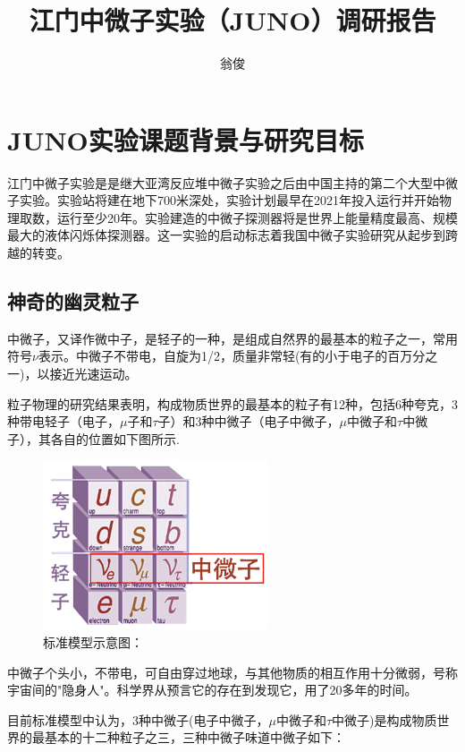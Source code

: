 \documentclass[10pt,a4paper]{article}
\author{翁俊}
\title{江门中微子实验（JUNO）调研报告}
\begin{document}
\maketitle
\newpage
\tableofcontents
\newpage

\section{JUNO实验课题背景与研究目标}

江门中微子实验是是继大亚湾反应堆中微子实验之后由中国主持的第二个大型中微子实验。实验站将建在地下700米深处，实验计划最早在2021年投入运行并开始物理取数，运行至少20年。实验建造的中微子探测器将是世界上能量精度最高、规模最大的液体闪烁体探测器。这一实验的启动标志着我国中微子实验研究从起步到跨越的转变。

	
\subsection{神奇的幽灵粒子}
中微子，又译作微中子，是轻子的一种，是组成自然界的最基本的粒子之一，常用符号$\nu$表示。中微子不带电，自旋为1/2，质量非常轻(有的小于电子的百万分之一)，以接近光速运动。



粒子物理的研究结果表明，构成物质世界的最基本的粒子有12种，包括6种夸克，3种带电轻子（电子，$\mu $子和$\tau$子）和3种中微子（电子中微子，$\mu$中微子和$\tau$中微子），其各自的位置如下图所示.

\begin{figure}[ht]
 \centering
 \includegraphics[height=5cm]{images/standarmodel.jpg}
 \caption{标准模型示意图：}
 \label{fig:singleblock}
\end{figure}

中微子个头小，不带电，可自由穿过地球，与其他物质的相互作用十分微弱，号称宇宙间的"隐身人"。科学界从预言它的存在到发现它，用了20多年的时间。

目前标准模型中认为，3种中微子(电子中微子，$\mu$中微子和$\tau$中微子)是构成物质世界的最基本的十二种粒子之三，三种中微子味道中微子如下：
\end{document}
